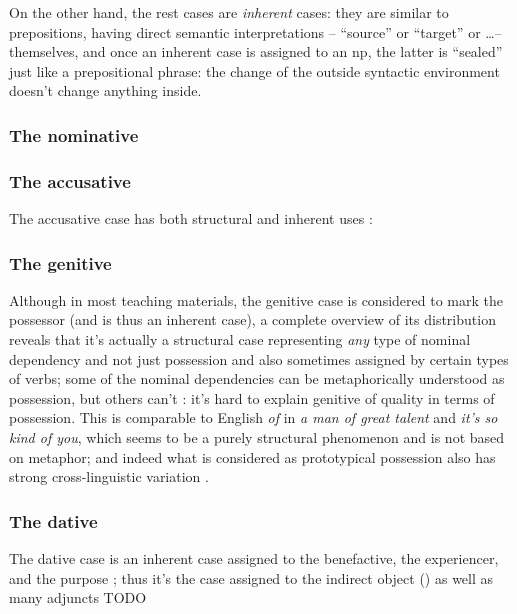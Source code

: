 \documentclass[a4paper, oneside, 12pt]{report}
\newcommand*{\citepage}[1]{p.~{#1}}
\newcommand*{\citepages}[1]{pp.~{#1}}
\newcommand{\form}[1]{\emph{#1}}
\begin{document}
On the other hand, the rest cases are \emph{inherent} cases:
they are similar to prepositions, having direct semantic interpretations
-- ``source'' or ``target'' or \dots -- themselves,
and once an inherent case is assigned to an \acs{np},
the latter is ``sealed'' just like a prepositional phrase:
the change of the outside syntactic environment 
doesn't change anything inside.

\subsubsection{The nominative}

\subsubsection{The accusative}\label{sec:accusative-distribution}

The accusative case has both structural and inherent uses
\citep[\citepage{238}]{oniga2014latin}: 

\subsubsection{The genitive}\label{sec:genitive-distribution}

Although in most teaching materials, the genitive case is considered 
to mark the possessor (and is thus an inherent case), 
a complete overview of its distribution reveals that 
it's actually a structural case 
representing \emph{any} type of nominal dependency 
and not just possession 
and also sometimes assigned by certain types of verbs;
some of the nominal dependencies can be 
metaphorically understood as possession, 
but others can't \citep[\citepage{244}]{oniga2014latin}:
it's hard to explain genitive of quality 
in terms of possession.
This is comparable to English \form{of}
in \form{a man of great talent} and \form{it's so kind of you},
which seems to be a purely structural phenomenon
and is not based on metaphor;
and indeed what is considered as prototypical possession 
also has strong cross-linguistic variation 
\citep[\citepages{262-263}]{dixon2010basic2}.

\subsubsection{The dative}\label{sec:dative-distribution}

The dative case is an inherent case assigned to the benefactive, the experiencer, and the purpose
\citep[\citepage{251}]{oniga2014latin};
thus it's the case assigned to the indirect object ()
as well as many adjuncts TODO
\end{document}
